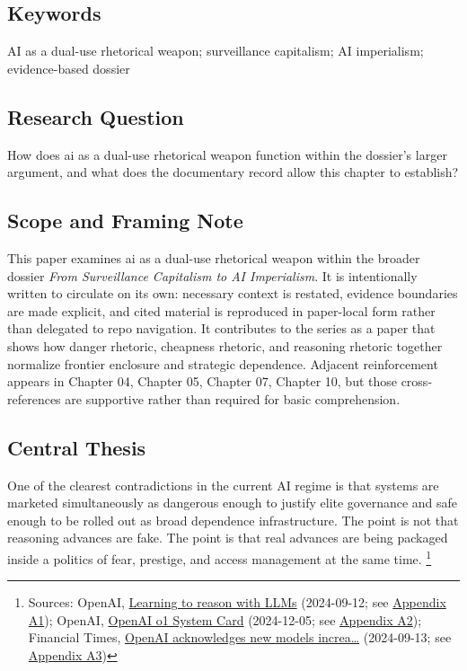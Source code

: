 \documentclass[
  american,
  11pt,
  letterpaper,
]{article}
\begin{document}
\subsection{Keywords}\label{keywords-6}

AI as a dual-use rhetorical weapon; surveillance capitalism; AI
imperialism; evidence-based dossier

\subsection{Research Question}\label{research-question-6}

How does ai as a dual-use rhetorical weapon function within the
dossier's larger argument, and what does the documentary record allow
this chapter to establish?

\subsection{Scope and Framing Note}\label{scope-and-framing-note-6}

This paper examines ai as a dual-use rhetorical weapon within the
broader dossier \emph{From Surveillance Capitalism to AI Imperialism}.
It is intentionally written to circulate on its own: necessary context
is restated, evidence boundaries are made explicit, and cited material
is reproduced in paper-local form rather than delegated to repo
navigation. It contributes to the series as a paper that shows how
danger rhetoric, cheapness rhetoric, and reasoning rhetoric together
normalize frontier enclosure and strategic dependence. Adjacent
reinforcement appears in Chapter 04, Chapter 05, Chapter 07, Chapter 10,
but those cross-references are supportive rather than required for basic
comprehension.

\subsection{Central Thesis}\label{central-thesis-6}

One of the clearest contradictions in the current AI regime is that
systems are marketed simultaneously as dangerous enough to justify elite
governance and safe enough to be rolled out as broad dependence
infrastructure. The point is not that reasoning advances are fake. The
point is that real advances are being packaged inside a politics of
fear, prestige, and access management at the same time. \footnote{Sources:
  OpenAI,
  \href{https://openai.com/index/learning-to-reason-with-llms/}{Learning
  to reason with LLMs} (2024-09-12; see
  \hyperref[ch-06-appendix-a1-learning-to-reason-with-llms]{Appendix
  A1}); OpenAI,
  \href{https://openai.com/index/openai-o1-system-card/}{OpenAI o1
  System Card} (2024-12-05; see
  \hyperref[ch-06-appendix-a2-openai-o1-system-card]{Appendix A2});
  Financial Times,
  \href{https://www.ft.com/content/37ba7236-2a64-4807-b1e1-7e21ee7d0914}{OpenAI
  acknowledges new models increa\ldots{}} (2024-09-13; see
  \hyperref[ch-06-appendix-a3-openai-acknowledges-new-models-increase-risk-of-misuse-to-create-bioweapons]{Appendix
  A3})}
\end{document}
